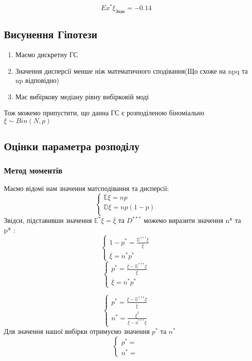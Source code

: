 \documentclass{article}
\begin{document}
$$Ex^*\xi_{\textrm{Знач}} = -0.14$$

\newpage
\subsection{Висунення Гіпотези}
\begin{enumerate}
    \item Маємо дискретну ГС
    \item Значення дисперсії менше ніж математичного сподівання(Що схоже на npq та np відповідно)
    \item Має вибіркову медіану рівну вибірковій моді
\end{enumerate}
Тож можемо припустити, що данна ГС є розподіленою біноміально \\ $\xi \sim Bin(N, p)$
\newpage
\subsection{Оцінки параметра розподілу}
\subsubsection{Метод моментів}
Маємо відомі нам значення матсподівання та дисперсії:
$$
\begin{cases}
    \mathbb{E}\xi=np \\
    \mathbb{D}\xi=np(1-p)\\
\end{cases}
$$
Звідси, підставивши значення $\mathbb{E}^*\xi = \overline{\xi}$ та $D^{***}$ можемо виразити
значення n* та p* :
$$
\begin{cases}
    1-p^* = \frac{\mathbb{D}^{***}\xi}{\overline{\xi}}\\
    \overline{\xi} = n^*p^*
\end{cases}
$$
$$
\begin{cases}
    p^* = \frac{\overline{\xi} - \mathbb{D}^{***}\xi}{\overline{\xi}}\\
    \overline{\xi} = n^*p^*
\end{cases}
$$

$$
\begin{cases}
    p^* = \frac{\overline{\xi} - \mathbb{D}^{***}\xi}{\overline{\xi}}\\
    n^* = \frac{\overline{\xi}^2}{\overline{\xi} - \mathbb{d}^{***}\xi}
\end{cases}
$$
Для значення нашої вибірки отримуємо значення $p^*$ та $n^*$
$$
\begin{cases}
    p^* = \\
    n^* = 
\end{cases}
$$
\end{document}
